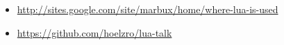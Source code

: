 \begin{frame}

\begin{itemize}
\item \scriptsize{\url{http://sites.google.com/site/marbux/home/where-lua-is-used}}
\item \scriptsize{\url{https://github.com/hoelzro/lua-talk}}
\end{itemize}

\end{frame}
